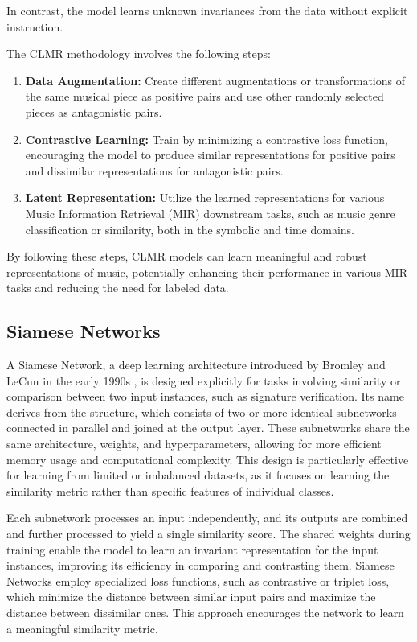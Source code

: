 In contrast, the model learns unknown invariances from the data without explicit instruction.

The CLMR methodology involves the following steps:

\begin{enumerate}
\item \textbf{Data Augmentation:} Create different augmentations or transformations of the same musical piece as positive pairs and use other randomly selected pieces as antagonistic pairs.
\item \textbf{Contrastive Learning:} Train by minimizing a contrastive loss function, encouraging the model to produce similar representations for positive pairs and dissimilar representations for antagonistic pairs.
\item\textbf{Latent Representation:} Utilize the learned representations for various Music Information Retrieval (MIR) downstream tasks, such as music genre classification or similarity, both in the symbolic and time domains.
\end{enumerate}

By following these steps, CLMR models can learn meaningful and robust representations of music, potentially enhancing their performance in various MIR tasks and reducing the need for labeled data.

\subsection{Siamese Networks}

A Siamese Network, a deep learning architecture introduced by Bromley and LeCun in the early 1990s \cite{Bromley1993SignatureNetwork}, is designed explicitly for tasks involving similarity or comparison between two input instances, such as signature verification. Its name derives from the structure, which consists of two or more identical subnetworks connected in parallel and joined at the output layer. These subnetworks share the same architecture, weights, and hyperparameters, allowing for more efficient memory usage and computational complexity. This design is particularly effective for learning from limited or imbalanced datasets, as it focuses on learning the similarity metric rather than specific features of individual classes.

Each subnetwork processes an input independently, and its outputs are combined and further processed to yield a single similarity score. The shared weights during training enable the model to learn an invariant representation for the input instances, improving its efficiency in comparing and contrasting them. Siamese Networks employ specialized loss functions, such as contrastive or triplet loss, which minimize the distance between similar input pairs and maximize the distance between dissimilar ones. This approach encourages the network to learn a meaningful similarity metric.


